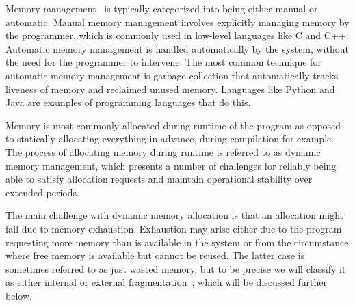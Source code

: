 
Memory management~\cite{gchandbook} is typically categorized into being either manual or automatic. Manual memory management involves explicitly managing memory by the programmer, which is commonly used in low-level languages like C and C++. Automatic memory management is handled automatically by the system, without the need for the programmer to intervene. The most common technique for automatic memory management is garbage collection that automatically tracks liveness of memory and reclaimed unused memory. Languages like Python and Java are examples of programming languages that do this.

Memory is most commonly allocated during runtime of the program as opposed to statically allocating everything in advance, during compilation for example. The process of allocating memory during runtime is referred to as dynamic memory management, which presents a number of challenges for reliably being able to satisfy allocation requests and maintain operational stability over extended periods.

The main challenge with dynamic memory allocation is that an allocation might fail due to memory exhaustion. Exhaustion may arise either due to the program requesting more memory than is available in the system or from the circumstance where free memory is available but cannot be reused. The latter case is sometimes referred to as just wasted memory, but to be precise we will classify it as either internal or external fragmentation~\cite{gchandbook}, which will be discussed further below.

